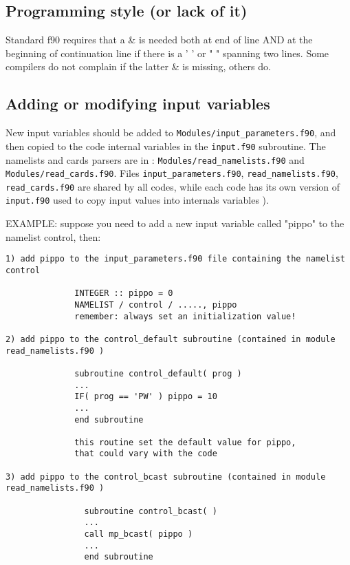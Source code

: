 \documentclass[12pt,a4paper]{article}
\begin{document}
\subsection{Programming style (or lack of it)}

Standard f90 requires that a \& is needed both at end of line 
AND at the beginning of continuation line if there is a ' ' 
or " " spanning two lines. Some compilers do not complain
if the latter \& is missing, others do.

\subsection{Adding or modifying input variables}

New input variables should be added to \texttt{Modules/input\_parameters.f90}, 
and then copied to the code internal variables in the \texttt{input.f90}
subroutine. The namelists and cards parsers are in :
\texttt{Modules/read\_namelists.f90} and \texttt{Modules/read\_cards.f90}.
Files \texttt{input\_parameters.f90}, \texttt{read\_namelists.f90},
\texttt{read\_cards.f90} are shared by all codes, while each code 
has its own version of \texttt{input.f90}  used to copy input values 
into internals variables ).

EXAMPLE:
suppose you need to add a new input variable called "pippo"
to the namelist control, then:

\begin{verbatim}
1) add pippo to the input_parameters.f90 file containing the namelist
control

              INTEGER :: pippo = 0
              NAMELIST / control / ....., pippo
              remember: always set an initialization value!

2) add pippo to the control_default subroutine (contained in module
read_namelists.f90 )

              subroutine control_default( prog )
              ...
              IF( prog == 'PW' ) pippo = 10
              ...
              end subroutine

              this routine set the default value for pippo,
              that could vary with the code

3) add pippo to the control_bcast subroutine (contained in module 
read_namelists.f90 )

                subroutine control_bcast( )
                ...
                call mp_bcast( pippo )
                ...
                end subroutine
\end{verbatim}
\end{document}
